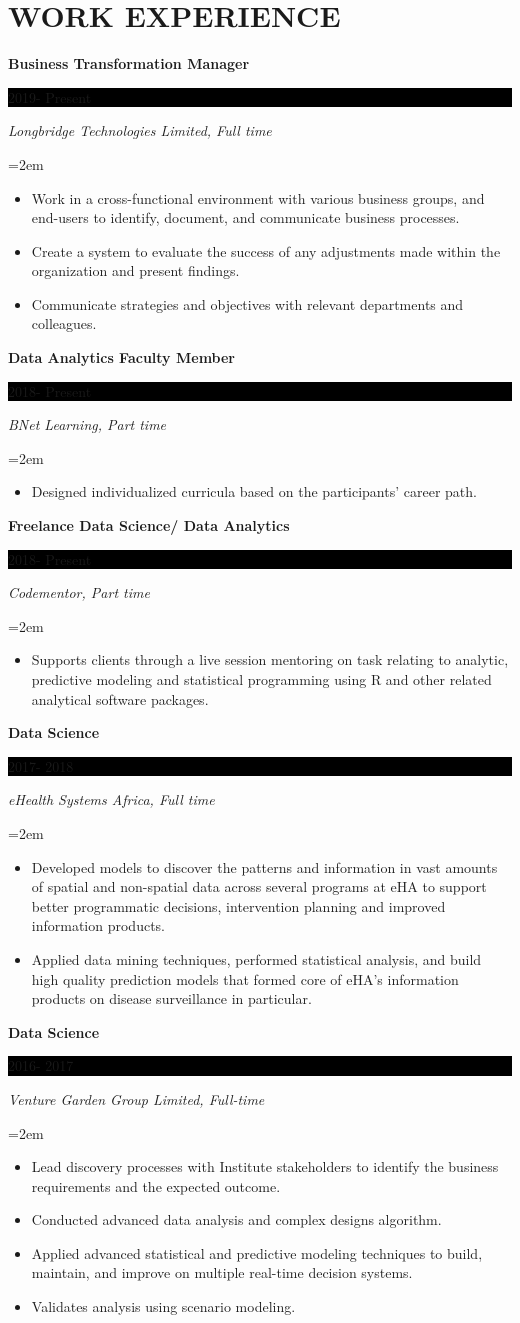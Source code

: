 \documentclass[paper=a4,fontsize=10pt]{scrartcl} %
\newcommand{\sepspace}{\vspace*{1em}}       %
\newcommand{\NewPart}[1]{\section*{\uppercase{#1}}}
\newcommand{\EducationEntry}[4]{
        \noindent \textbf{#1} \hfill      %
        \colorbox{Black}{%
            \parbox{6em}{%
            \hfill\color{White}#2}} \par  %
        \noindent \textit{#3} \par        %
        \noindent\hangindent=2em\hangafter=0 \small #4 %
        \normalsize \par}
\begin{document}
\NewPart{Work experience}{}

\EducationEntry{Business Transformation Manager}{2019- Present}{Longbridge Technologies Limited, Full time}{
	\begin{itemize}
		\item Work in a cross-functional environment with various business groups, and end-users to identify, document, and communicate business processes.
		\item Create a system to evaluate the success of any adjustments made within the organization and present findings.
		\item Communicate strategies and objectives with relevant departments and colleagues.
		
\end{itemize}}
\sepspace



\EducationEntry{Data Analytics Faculty Member}{2018- Present}{BNet Learning, Part time}{
\begin{itemize}
	\item Designed individualized curricula based on the participants' career path.
\end{itemize}}
\sepspace


\EducationEntry{Freelance Data Science/ Data Analytics}{2018- Present}{Codementor, Part time}{
	\begin{itemize}
		\item	Supports clients through a live session mentoring on task relating to analytic, predictive modeling and statistical programming using R and other related analytical software packages.
\end{itemize}}
\sepspace

\EducationEntry{Data Science}{2017- 2018}{eHealth Systems Africa, Full time}{
	\begin{itemize}
		\item	Developed models to discover the patterns and information in vast amounts of spatial and non-spatial data across several programs at eHA to support better programmatic decisions, intervention planning and improved information products.
		\item	Applied data mining techniques, performed statistical analysis, and build high quality prediction models that formed core of eHA's information products on disease surveillance in particular.
		
\end{itemize}}
\sepspace

\EducationEntry{Data Science}{2016- 2017}{Venture Garden Group Limited, Full-time}{
	\begin{itemize}
\item	Lead discovery processes with Institute stakeholders to identify the business requirements and the expected outcome.
\item	Conducted advanced data analysis and complex designs algorithm.
	\item Applied advanced statistical and predictive modeling techniques to build, maintain, and improve on multiple real-time decision systems.
\item 	Validates analysis using scenario modeling.
	\end{itemize}}
\sepspace
\end{document}
